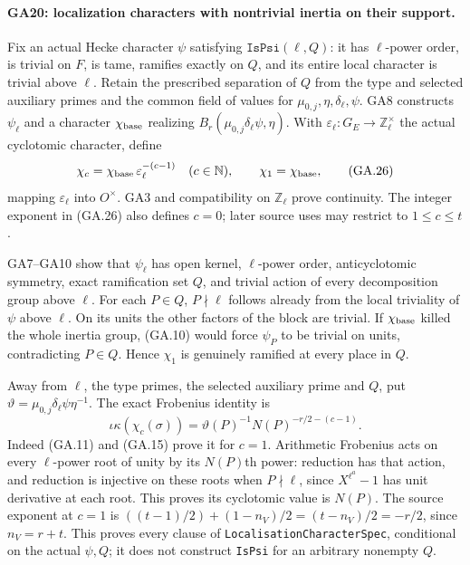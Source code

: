 \paragraph{GA20: localization characters with nontrivial inertia on their support.}
Fix an actual Hecke character $\psi$ satisfying
$\texttt{IsPsi}(\ell,Q)$: it has $\ell$-power order,
is trivial on $F$, is tame, ramifies exactly on $Q$,
and its entire local character is trivial above $\ell$.
Retain the prescribed separation of $Q$ from the type
and selected auxiliary primes and the common field of
values for $\mu_{0,j},\eta,\delta_\ell,\psi$.
GA8 constructs $\psi_\ell$ and a character $\chi_{\rm base}$ realizing
$B_r(\mu_{0,j}\delta_\ell\psi,\eta)$. With
$\varepsilon_\ell:G_E\to\mathbb Z_\ell^\times$
the actual cyclotomic character, define
\[
 \chi_c=\chi_{\rm base}\,\varepsilon_\ell^{-(c-1)}
       \quad(c\in\mathbb N),\qquad \chi_1=\chi_{\rm base}, \tag{GA.26}
\]
mapping $\varepsilon_\ell$ into $O^\times$. GA3 and
compatibility on $\mathbb Z_\ell$ prove continuity.
The integer exponent in (GA.26) also defines $c=0$;
later source uses may restrict to $1\leq c\leq t$.

GA7--GA10 show that $\psi_\ell$ has open kernel,
$\ell$-power order, anticyclotomic symmetry, exact
ramification set $Q$, and trivial action of every
decomposition group above $\ell$.
For each $P\in Q$, $P\nmid\ell$ follows already from
the local triviality of $\psi$ above $\ell$.
On its units the other factors of the block are trivial.
If $\chi_{\rm base}$ killed the whole inertia group, (GA.10) would
force $\psi_P$ to be trivial on units, contradicting
$P\in Q$. Hence $\chi_1$ is genuinely ramified at
every place in $Q$.

Away from $\ell$, the type primes, the selected auxiliary
prime and $Q$, put
$\vartheta=\mu_{0,j}\delta_\ell\psi\eta^{-1}$. The exact
Frobenius identity is
\[
 \iota\kappa(\chi_c(\sigma))
     =\vartheta(P)^{-1}N(P)^{-r/2-(c-1)}.               \tag{GA.27}
\]
Indeed (GA.11) and (GA.15) prove it for $c=1$.
Arithmetic Frobenius acts on every $\ell$-power root
of unity by its $N(P)$th power: reduction has that
action, and reduction is injective on these roots
when $P\nmid\ell$, since $X^{\ell^a}-1$ has unit
derivative at each root. This proves its cyclotomic
value is $N(P)$.
The source exponent at $c=1$ is
$((t-1)/2)+(1-n_V)/2=(t-n_V)/2=-r/2$,
since $n_V=r+t$. This proves every clause of
\texttt{LocalisationCharacterSpec}, conditional on
the actual $\psi,Q$; it does not construct
\texttt{IsPsi} for an arbitrary nonempty $Q$.

